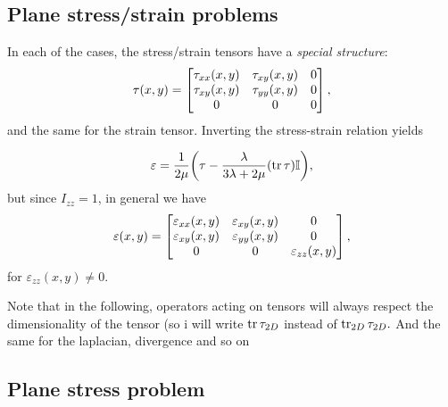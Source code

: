 \documentclass[reqno, a4paper]{article}
\begin{document}
\subsection{Plane stress/strain problems}
\label{sec:plane_problems}

In each of the cases, the stress/strain tensors have a \textit{special structure}:
\begin{equation}
	\label{eq:plane_structure}
	\mathbb{\tau}\qty(x,y)=\begin{bmatrix}
		\tau_{xx}\qty(x,y) & \tau_{xy}\qty(x,y) & 0\\
		\tau_{xy}\qty(x,y) & \tau_{yy}\qty(x,y) & 0\\
		0 & 0 & 0
	\end{bmatrix},
\end{equation}
and the same for the strain tensor. Inverting the stress-strain relation yields

\[
	\mathbb{\varepsilon} = \frac{1}{2 \mu}\qty(\mathbb{\tau}-\frac{\lambda}{3 \lambda+2 \mu}\qty(\tr \mathbb{\tau})\mathbb{I}),
\]
but since $I_{zz} = 1$, in general we have
\[
	\mathbb{\varepsilon}\qty(x,y)=\begin{bmatrix}
		\varepsilon_{xx}\qty(x,y) & \varepsilon_{xy}\qty(x,y) & 0 \\
		\varepsilon_{xy}\qty(x,y) & \varepsilon_{yy}\qty(x,y) & 0 \\
		0 & 0 & \varepsilon_{zz}(x,y)
	\end{bmatrix},
\]
for $\varepsilon_{zz}(x,y) \neq 0$.

\begin{remark}[Notation]
Note that in the following, operators acting on tensors will always respect the dimensionality of the tensor (so i will write $\tr \mathbb{\tau}_{2D}$ instead of $\tr_{2D} \mathbb{\tau}_{2D}.$ And the same for the laplacian, divergence and so on
\end{remark}

\subsection{Plane stress problem}
\label{sec:plane_stress_problem}
\end{document}
